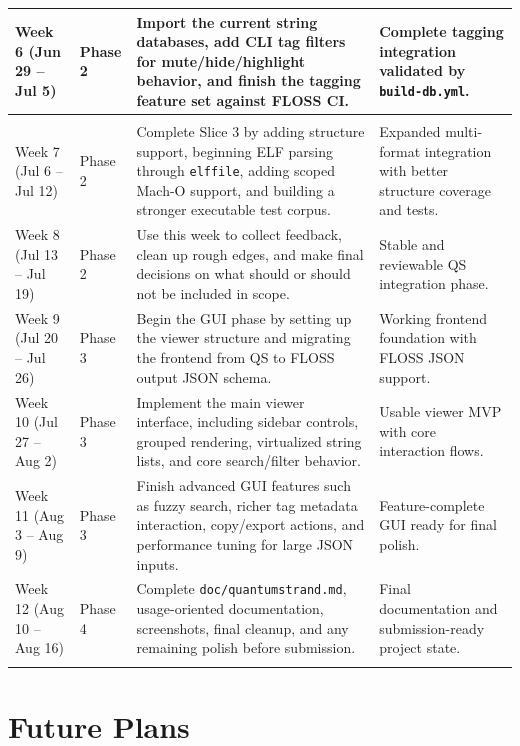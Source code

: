 \documentclass[12pt]{article}
\begin{document}
{\begin{longtable}{|>{\centering\arraybackslash}m{1.45in}|>{\centering\arraybackslash}m{0.95in}|>{\raggedright\arraybackslash}m{2.55in}|>{\raggedright\arraybackslash}m{1.05in}|}
\hline
\rowcolor{Cerulean!10}
Week 6 (Jun 29 -- Jul 5) & Phase 2 & Import the current string databases, add CLI tag filters for mute/hide/highlight behavior, and finish the tagging feature set against FLOSS CI. & Complete tagging integration validated by \texttt{build-db.yml}. \\
\hline
\rowcolor{Goldenrod!18}
\multicolumn{4}{|c|}{\textbf{Midterm Evaluation} (\textbf{July 10, 2026})} \\
\hline
\rowcolor{Cerulean!10}
Week 7 (Jul 6 -- Jul 12) & Phase 2 & Complete Slice 3 by adding structure support, beginning ELF parsing through \texttt{elffile}, adding scoped Mach-O support, and building a stronger executable test corpus. & Expanded multi-format integration with better structure coverage and tests. \\
\hline
\rowcolor{Cerulean!10}
Week 8 (Jul 13 -- Jul 19) & Phase 2 & Use this week to collect feedback, clean up rough edges, and make final decisions on what should or should not be included in scope. & Stable and reviewable QS integration phase. \\
\hline
\rowcolor{Apricot!18}
Week 9 (Jul 20 -- Jul 26) & Phase 3 & Begin the GUI phase by setting up the viewer structure and migrating the frontend from QS to FLOSS output JSON schema. & Working frontend foundation with FLOSS JSON support. \\
\hline
\rowcolor{Apricot!18}
Week 10 (Jul 27 -- Aug 2) & Phase 3 & Implement the main viewer interface, including sidebar controls, grouped rendering, virtualized string lists, and core search/filter behavior. & Usable viewer MVP with core interaction flows. \\
\hline
\rowcolor{Apricot!18}
Week 11 (Aug 3 -- Aug 9) & Phase 3 & Finish advanced GUI features such as fuzzy search, richer tag metadata interaction, copy/export actions, and performance tuning for large JSON inputs. & Feature-complete GUI ready for final polish. \\
\hline
\rowcolor{Orchid!10}
Week 12 (Aug 10 -- Aug 16) & Phase 4 & Complete \texttt{doc/quantumstrand.md}, usage-oriented documentation, screenshots, final cleanup, and any remaining polish before submission. & Final documentation and submission-ready project state. \\
\hline
\rowcolor{Goldenrod!25}
\multicolumn{4}{|c|}{\textbf{Final Submission} (\textbf{August 24, 2026})} \\
\hline
\end{longtable}
}

\newpage
\section*{Future Plans}
{}
\end{document}
